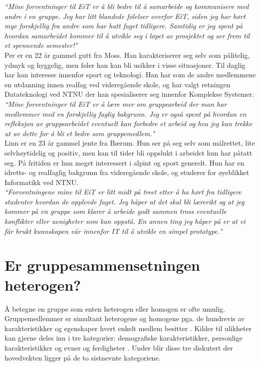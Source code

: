 \textit{``Mine forventninger til EiT er å bli bedre til å samarbeide og kommunisere med andre i en gruppe. Jeg har litt blandede følelser overfor EiT, siden jeg har hørt mye forskjellig fra andre som har hatt faget tidligere. Samtidig er jeg spent på hvordan samarbeidet kommer til å utvikle seg i løpet av prosjektet og ser frem til et spennende semester!"}\\

Per er en 22 år gammel gutt fra Moss. Han karakteriserer seg selv som pålitelig, ydmyk og hyggelig, men føler han kan bli usikker i visse situasjoner. Til daglig har han interesse innenfor sport og teknologi. Han har som de andre medlemmene en utdanning innen realfag ved videregående skole, og har valgt retningen Datateknologi ved NTNU der han spesialiserer seg innenfor Komplekse Systemer.\\

\textit{``Mine forventninger til EiT er å lære mer om gruppearbeid der man har medlemmer med en forskjellig faglig bakgrunn. Jeg er også spent på hvordan en refleksjon av gruppearbeidet eventuelt kan forbedre et arbeid og hva jeg kan trekke ut av dette for å bli et bedre som gruppemedlem."}\\

Linn er en 23 år gammel jente fra Bærum. Hun ser på seg selv som målrettet, lite selvhøytidelig og positiv, men kan til tider bli oppslukt i arbeidet hun har påtatt seg. På fritiden er hun meget interessert i alpint og sport generelt. Hun har en idretts- og realfaglig bakgrunn fra videregående skole, og studerer for øyeblikket Informatikk ved NTNU.\\

\textit{``Forventningene mine til EiT er litt midt på treet etter å ha hørt fra tidligere studenter hvordan de opplevde faget. Jeg håper at det skal bli lærerikt og at jeg kommer på en gruppe som klarer å arbeide godt sammen tross eventuelle konflikter eller uenigheter som kan oppstå. En annen ting jeg håper på er at vi får brukt kunnskapen vår innenfor IT til å utvikle en simpel prototype."}\\

\section{Er gruppesammensetningen heterogen?}
\label{sec:gruppesammensetning}
Å betegne en gruppe som enten heterogen eller homogen er ofte umulig. Gruppemedlemmer er simultant heterogene og homogene pga. de hundrevis av karakteristikker og egenskaper hvert enkelt medlem besitter \cite{gruppeteori}. Kilder til ulikheter kan gjerne deles inn i tre kategorier: demografiske karakteristikker, personlige karakteristikker og evner og ferdigheter \cite{gruppeteori}. Under blir disse tre diskutert der hovedvekten ligger på de to sistnevnte kategoriene.\\

